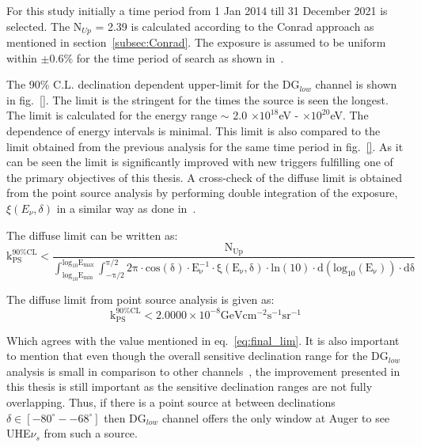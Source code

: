 For this study initially a time period from 1 Jan 2014 till 31 December 2021 is selected. The N$_{Up}$ = 2.39 is calculated according to the Conrad approach as mentioned in section~\ref{subsec:Conrad}. The exposure is assumed to be uniform within $\pm 0.6\%$ for the time period of search as shown in~\cite{PierreAuger:2017pzq}. 

The 90\% C.L. declination dependent upper-limit for the DG$_{low}$ channel is shown in fig.~\ref{}. The limit is the stringent for the times the source is seen the longest. The limit is calculated for the energy range $\sim$ 2.0 $\times 10^{18}$eV - $\times 10^{20}$eV. The dependence of energy intervals is minimal. This limit is also compared to the limit obtained from the previous analysis for the same time period in fig.~\ref{}. As it can be seen the limit is significantly improved with new triggers fulfilling one of the primary objectives of this thesis.     
A cross-check of the diffuse limit is obtained from the point source analysis by performing double integration of the exposure, $\xi(E_{\nu}, \delta)$ in a similar way as done in~\cite{gap_note_2013}.

The diffuse limit can be written as:
\begin{equation}
  \mathrm{k_{PS}^{90\%CL} < \frac{N_{Up}}{\int_{log_{10}E_{min}}^{log_{10}E_{max}} \int_{-\pi/2}^{\pi/2}2\pi \cdot cos(\delta) \cdot E_{\nu}^{-1} \cdot \xi(E_{\nu}, \delta) \cdot ln(10) \cdot d(log_{10}(E_{\nu})) \cdot d\delta}} 
\end{equation}

The diffuse limit from point source analysis is given as: 
\begin{equation}
  \mathrm{k_{PS}^{90\%CL} < 2.0000 \times 10^{-8} GeV cm^{-2} s^{-1} sr^{-1}}
\end{equation}

Which agrees with the value mentioned in eq.~\ref{eq:final_lim}. It is also important to mention that even though the overall sensitive declination range for the DG$_{low}$ analysis is small in comparison to other channels~\cite{Aab_2019_point}, the improvement presented in this thesis is still important as the sensitive declination ranges are not fully overlapping. Thus, if there is a point source at between declinations $ \delta \in [-80^{\circ}- -68^{\circ}]$ then DG$_{low}$ channel offers the only window at Auger to see UHE$\nu_s$ from such a source.  





